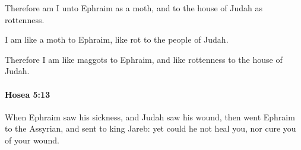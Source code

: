 			\begin{versebox}
					\item[BHS] 
					\item[LXX] 
					\item[ASV] Therefore am I unto Ephraim as a moth, and to the house of Judah as rottenness.
					\item[NIV] I am like a moth to Ephraim, like rot to the people of Judah.
					\item[NRSV] Therefore I am like maggots to Ephraim, and like rottenness to the house of Judah.
			\end{versebox}

		\paragraph{Hosea 5:13} %
			\label{HOSEA-5-13}

			When Ephraim saw his sickness, and Judah saw his wound, then went Ephraim to the Assyrian, and sent to king Jareb: yet could he not heal you, nor cure you of your wound.

